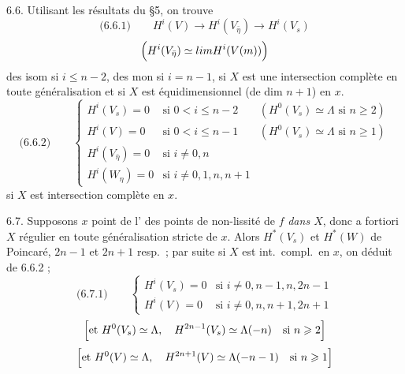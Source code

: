 \documentclass[11pt,a4paper]{article}
\begin{document}
6.6. Utilisant les résultats du §5, on trouve
\[
\text{(6.6.1)}\qquad
H^i(V) \longrightarrow H^i(V_{\bar\eta}) \longrightarrow H^i(V_s)
\]
\[
\Bigl(H^i(V_{\bar\eta}) \simeq \varinjlim H^i(V(m))\Bigr)
\]
des isom si $i \leqslant n-2$, des mon si $i = n-1$, si $X$ est une intersection complète en toute généralisation \struck{\ill{}}   et si $X$ est équidimensionnel (de dim $n+1$) en $x$.
\[
\text{(6.6.2)}\qquad
\left\{
\begin{array}{lll}
H^i(V_s) = 0 & \text{si } 0 < i \leqslant n-2 & (H^0(V_s) \simeq \Lambda \text{ si } n \geqslant 2)\\
H^i(V) = 0 & \text{si } 0 < i \leqslant n-1 & (H^0(V_s) \simeq \Lambda \text{ si } n \geqslant 1)\\
H^i(V_{\bar\eta}) = 0 & \text{si } i \neq 0, n & \\
H^i(W_\eta) = 0 & \text{si } i \neq 0, 1, n, n+1 &
\end{array}
\right.
\]
si $X$ est intersection complète en $x$.


6.7. Supposons \struck{\ill{}} $x$ point  de l' des points de non-lissité de $f$ \emph{dans $X$}, donc a fortiori $X$ régulier en toute généralisation stricte de $x$. Alors $H^*(V_s)$ et $H^*(W)$ \ill{} \struck{\ill{}} \add{\ill{}} de Poincaré, \struck{\ill{}}  $2n-1$ et $2n+1$ resp.\ ; \struck{\ill{}} par suite si $X$ est  int.\ compl.\ en $x$, on déduit de 6.6.2 ; \struck{\ill{}}
\[
\text{(6.7.1)}\qquad
\left\{
\begin{array}{ll}
H^i(V_s) = 0 & \text{si } i \neq 0, n-1, n, 2n-1\\
H^i(V) = 0 & \text{si } i \neq 0, n, n+1, 2n+1
\end{array}
\right.
\]
\[
\Bigl[\text{et } H^0(V_s) \simeq \Lambda,\quad H^{2n-1}(V_s) \simeq \Lambda(-n) \quad \text{si } n \geqslant 2\Bigr]
\]
\[
\Bigl[\text{et } H^0(V) \simeq \Lambda,\quad H^{2n+1}(V) \simeq \Lambda(-n-1) \quad \text{si } n \geqslant 1\Bigr]
\]
\end{document}
